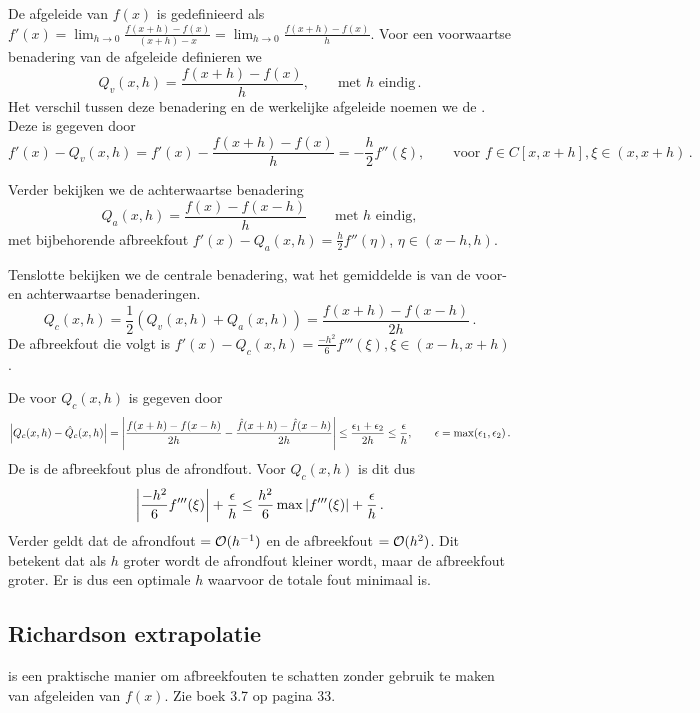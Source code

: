 \documentclass{2wn20summary}
\begin{document}
			\begin{define}
				De afgeleide van $ f(x) $ is gedefinieerd als $ f'(x) = \lim_{h \to 0} \frac{f(x+h)-f(x)}{(x+h) - x} = \lim_{h \to 0} \frac{f(x+h)-f(x)}{h} $. Voor een voorwaartse benadering van de afgeleide definieren we 
				\[ 
					Q_v(x,h) = \frac{f(x+h)-f(x)}{h}, \qquad \text{met $h$ eindig} \,.
				\]
				Het verschil tussen deze benadering en de werkelijke afgeleide noemen we de . Deze is gegeven door
				\[ 
					f'(x) - Q_v(x,h) = f'(x) -  \frac{f(x+h)-f(x)}{h} = - \frac{h}{2} f ''(\xi), \qquad \text{voor } f \in C[x,x+h], \xi \in (x,x+h)\,.
				\]
				
				Verder bekijken we de achterwaartse benadering 
				\[ 
					 Q_a(x,h) = \frac{f(x)-f(x-h)}{h} \qquad \text{met $h$ eindig} ,
				\]
				met bijbehorende afbreekfout $ f'(x) - Q_a(x,h) = \frac{h}{2} f ''(\eta) $, $\eta \in (x-h,h)$.
				
				Tenslotte bekijken we de centrale benadering, wat het gemiddelde is van de voor- en achterwaartse benaderingen. 
				\[ 
					Q_c(x,h) = \frac{1}{2} (Q_v(x,h) + Q_a(x,h)) = \frac{f(x+h)-f(x-h)}{2h}\,.
				\]
				De afbreekfout die volgt is $ f'(x) - Q_c(x,h) = \frac{-h^2}{6} f'''(\xi), \xi \in (x-h, x+h) $.
			\end{define}

			\begin{define}
				De   voor $ Q_c(x,h) $ is gegeven door
				\[
					\abs{Q_c(x,h) - \hat{Q}_c(x,h)} = \abs{\frac{f(x+h)-f(x-h)}{2h}- \frac{\hat{f}(x+h) - \hat{f}(x-h)}{2h}} \leq \frac{\epsilon_1 + \epsilon_2}{2h} \leq \frac{\epsilon}{h}, \qquad \epsilon = \max (\epsilon_1, \epsilon_2)\,.
				\]
				De  is de afbreekfout plus de afrondfout. Voor $ Q_c(x,h) $ is dit dus
				\[
					\abs{\frac{-h^2}{6}f'''(\xi)} + \frac{\epsilon}{h} \leq \frac{h^2}{6}\max\abs{f'''(\xi)}+ \frac{\epsilon}{h}\,.
				\]
				Verder geldt dat de afrondfout $ = \mathcal{O}(h^{-1}) $ en de afbreekfout $ = \mathcal{O}(h^2) $. Dit betekent dat als $h$ groter wordt de afrondfout kleiner wordt, maar de afbreekfout groter. Er is dus een optimale $h$ waarvoor de totale fout minimaal is.
			\end{define}

		\subsection{Richardson extrapolatie}
			 is een praktische manier om afbreekfouten te schatten zonder gebruik te maken van afgeleiden van $ f(x) $. Zie boek 3.7 op pagina 33.
\end{document}

